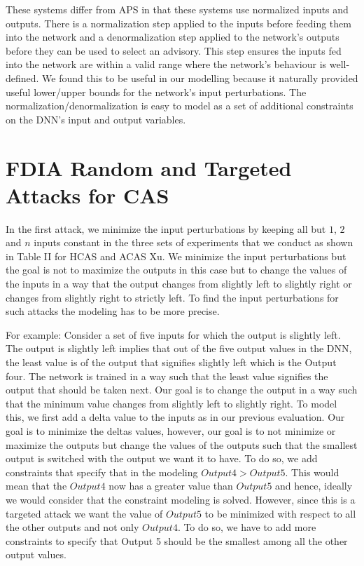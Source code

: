 These systems differ from APS in that these systems use normalized inputs and outputs. There is a normalization step applied to the inputs before feeding them into the network and a denormalization step applied to the network's outputs before they can be used to select an advisory. This step ensures the inputs fed into the network are within a valid range where the network's behaviour is well-defined. We found this to be useful in our modelling because it naturally provided useful lower/upper bounds for the network's input perturbations. The normalization/denormalization is easy to model as a set of additional constraints on the DNN's input and output variables. %

\section{FDIA Random and Targeted Attacks for CAS} 
In the first attack, we minimize the input perturbations by keeping all but $1$, $2$ and $n$ inputs constant in the three sets of experiments that we conduct as shown in Table II for HCAS and ACAS Xu. We minimize the input perturbations but the goal is not to maximize the outputs in this case but to change the values of the inputs in a way that the output changes from slightly left to slightly right or changes from slightly right to strictly left. To find the input perturbations for such attacks the modeling has to be more precise.

For example: Consider a set of five inputs for which the output is slightly left. The output is slightly left implies that out of the five output values in the DNN, the least value is of the output that signifies slightly left which is the Output four. The network is trained in a way such that the least value signifies the output that should be taken next. Our goal is to change the output in a way such that the minimum value changes from slightly left to slightly right. To model this, we first add a delta value to the inputs as in our previous evaluation. Our goal is to minimize the deltas values, however, our goal is to not minimize or maximize the outputs but change the values of the outputs such that the smallest output is switched with the output we want it to have. To do so, we add constraints that specify that in the modeling $Output 4 > Output 5$. This would mean that the $Output 4$ now has a greater value than $Output 5$ and hence, ideally we would consider that the constraint modeling is solved. However, since this is a targeted attack we want the value of $Output 5$ to be minimized with respect to all the other outputs and not only $Output 4$. To do so, we have to add more constraints to specify that Output 5 should be the smallest among all the other output values.

